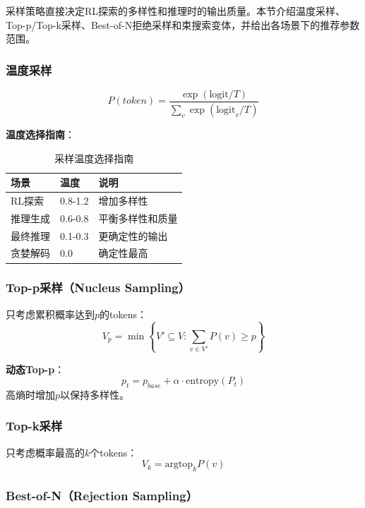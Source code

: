 \documentclass[12pt,a4paper]{article}
\begin{document}
采样策略直接决定RL探索的多样性和推理时的输出质量。本节介绍温度采样、Top-p/Top-k采样、Best-of-N拒绝采样和束搜索变体，并给出各场景下的推荐参数范围。

\subsubsection{温度采样}

\begin{equation}
P(token) = \frac{\exp(\text{logit}/T)}{\sum_{v} \exp(\text{logit}_v/T)}
\end{equation}

\textbf{温度选择指南}：
\begin{table}[H]
\centering
\caption{采样温度选择指南}
\begin{tabular}{lll}
\toprule
\textbf{场景} & \textbf{温度} & \textbf{说明} \\
\midrule
RL探索 & 0.8-1.2 & 增加多样性 \\
推理生成 & 0.6-0.8 & 平衡多样性和质量 \\
最终推理 & 0.1-0.3 & 更确定性的输出 \\
贪婪解码 & 0.0 & 确定性最高 \\
\bottomrule
\end{tabular}
\end{table}

\subsubsection{Top-p采样（Nucleus Sampling）}

只考虑累积概率达到$p$的tokens：
\begin{equation}
V_p = \min\left\{V' \subseteq V : \sum_{v \in V'} P(v) \geq p\right\}
\end{equation}

\textbf{动态Top-p}：
\begin{equation}
p_t = p_{base} + \alpha \cdot \text{entropy}(P_t)
\end{equation}
高熵时增加$p$以保持多样性。

\subsubsection{Top-k采样}

只考虑概率最高的$k$个tokens：
\begin{equation}
V_k = \text{argtop}_k P(v)
\end{equation}

\subsubsection{Best-of-N（Rejection Sampling）}
\end{document}
